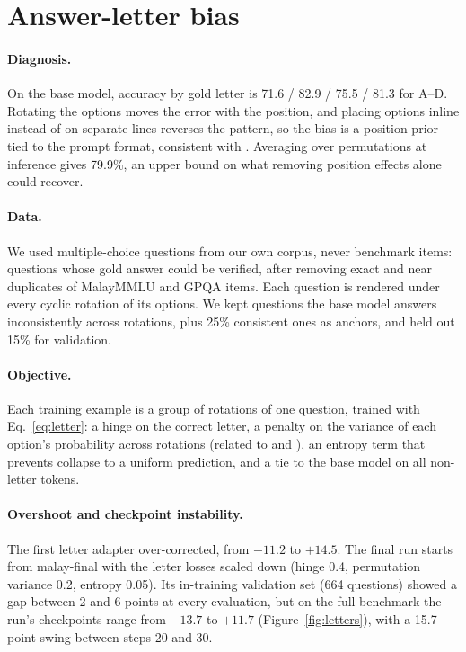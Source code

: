 \documentclass[11pt]{article}
\begin{document}
\section{Answer-letter bias}
\label{sec:letters}

\paragraph{Diagnosis.} On the base model, accuracy by gold letter is 71.6 / 82.9 / 75.5 / 81.3 for A--D. Rotating the options moves the error with the position, and placing options inline instead of on separate lines reverses the pattern, so the bias is a position prior tied to the prompt format, consistent with \citet{zheng2024pride}. Averaging over permutations at inference gives 79.9\%, an upper bound on what removing position effects alone could recover.

\paragraph{Data.} We used multiple-choice questions from our own corpus, never benchmark items: questions whose gold answer could be verified, after removing exact and near duplicates of MalayMMLU and GPQA items. Each question is rendered under every cyclic rotation of its options. We kept questions the base model answers inconsistently across rotations, plus 25\% consistent ones as anchors, and held out 15\% for validation.

\paragraph{Objective.} Each training example is a group of rotations of one question, trained with Eq.~\ref{eq:letter}: a hinge on the correct letter, a penalty on the variance of each option's probability across rotations (related to \citet{lora1_pbm} and \citet{pagrpo}), an entropy term that prevents collapse to a uniform prediction, and a tie to the base model on all non-letter tokens.

\paragraph{Overshoot and checkpoint instability.} The first letter adapter over-corrected, from $-11.2$ to $+14.5$. The final run starts from malay-final with the letter losses scaled down (hinge 0.4, permutation variance 0.2, entropy 0.05). Its in-training validation set (664 questions) showed a gap between 2 and 6 points at every evaluation, but on the full benchmark the run's checkpoints range from $-13.7$ to $+11.7$ (Figure~\ref{fig:letters}), with a 15.7-point swing between steps 20 and 30.
\end{document}
